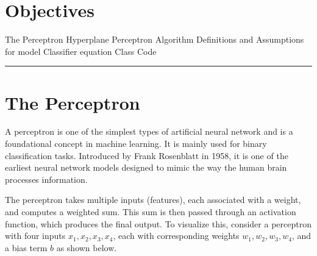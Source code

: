 \section*{Objectives}
\begin{outline}
    \1 The Perceptron 
    \1 Hyperplane
    \1 Perceptron Algorithm
    \1 Definitions and Assumptions for model
    \1 Classifier equation
    \1 Class Code
\end{outline}

\rule[0.0051in]{\textwidth}{0.00025in}

\section{The Perceptron}

A perceptron\cite{rosenblatt1958perceptron} is one of the simplest types of artificial neural network and is a foundational concept in machine learning. 
It is mainly used for binary classification tasks. Introduced by Frank Rosenblatt in 1958, it is one of the earliest neural network models designed to mimic the way the human brain processes information.

The perceptron takes multiple inputs (features), each associated with a weight, and computes a weighted sum. 
This sum is then passed through an activation function, which produces the final output. 
To visualize this, consider a perceptron with four inputs \( x_1, x_2, x_3, x_4 \), each with corresponding weights \( w_1, w_2, w_3, w_4 \), and a bias term \( b \) as shown below.

